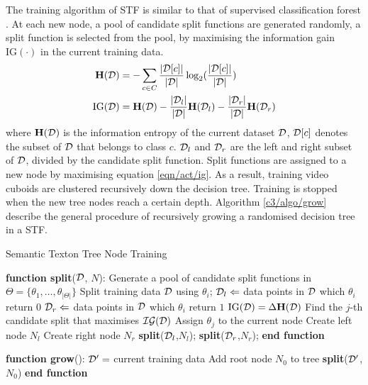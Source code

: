 The training algorithm of STF is similar to that of supervised classification forest \cite{Breiman2001}. At each new node, a pool of candidate split functions are generated randomly, a split function is selected from the pool, by maximising the information gain $\mathrm{IG}(\cdot)$ in the current training data. 
\begin{equation}
	\begin{aligned}
		\mathbf{H}(\mathcal{D}) & = -\sum_{c \in C} \frac{|\mathcal{D}[c]|}{|\mathcal{D}|}\log_{2}(\frac{|\mathcal{D}[c]|}{|\mathcal{D}|})\\ 
		\mathrm{IG}(\mathcal{D}) & = \mathbf{H}(\mathcal{D}) - \frac{|\mathcal{D}_{l}|}{|\mathcal{D}|}\mathbf{H}(\mathcal{D}_{l}) - \frac{|\mathcal{D}_{r}|}{|\mathcal{D}|}\mathbf{H}(\mathcal{D}_{r})
	\end{aligned}
	\label{eqn/act/ig}
\end{equation}
where $\mathbf{H}(\mathcal{D})$ is the information entropy of the current dataset $\mathcal{D}$, $\mathcal{D}[c]$ denotes the subset of $\mathcal{D}$ that belongs to class $c$. $\mathcal{D}_{l}$ and $\mathcal{D}_{r}$ are the left and right subset of $\mathcal{D}$, divided by the candidate split function. 
Split functions are assigned to a new node by maximising equation \ref{eqn/act/ig}. As a result, training video cuboids are clustered recursively down the decision tree. Training is stopped when the new tree nodes reach a certain depth. Algorithm \ref{c3/algo/grow} describe the general procedure of recursively growing a randomised decision tree in a STF.

\begin{algorithm}
\caption{Semantic Texton Tree Node Training}
\label{c3/algo/grow}
\begin{algorithmic}
	\STATE \hspace{-2em} \textbf{function split}($\mathcal{D}$, $N$):
	\STATE Generate a pool of candidate split functions in $\Theta = \{ \theta_{1},\dots,\theta_{|\Theta|}\}$
	\STATE Split training data $\mathcal{D}$ using $\theta_i$;
	\STATE $\mathcal{D}_l \Leftarrow$ data points in $\mathcal{D}$ which $\theta_i$ return $0$
	\STATE $\mathcal{D}_r \Leftarrow$ data points in $\mathcal{D}$ which $\theta_i$ return $1$
	\STATE $\mathrm{IG}(\mathcal{D}) = \Delta\mathbf{H}(\mathcal{D})$ 
	\ENDFOR
	\STATE Find the $j$-th candidate split that maximises $\mathcal{IG}(\mathcal{D})$
	\STATE Assign $\theta_j$ to the current node 
		\STATE Create left node $N_l$
		\STATE Create right node $N_r$
		\STATE \textbf{split}($\mathcal{D}_l$,$N_l$);
		\STATE \textbf{split}($\mathcal{D}_r$,$N_r$);
	\ENDIF
	\STATE \hspace{-2em} \textbf{end function}
\end{algorithmic}
\begin{algorithmic}
	\STATE \hspace{-2em} \textbf{function grow}():
	\STATE $\mathcal{D}' = $ current training data
	\STATE Add root node $N_{0}$ to tree
	\STATE \textbf{split}($\mathcal{D}'$, $N_{0}$)
	\STATE \hspace{-2em} \textbf{end function}
\end{algorithmic}
\end{algorithm}


